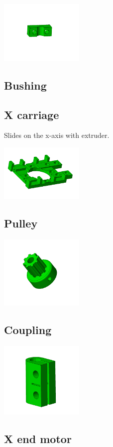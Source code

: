 \documentclass[11pt]{article}
\begin{document}
\includegraphics[width=4cm]{images/rod-clamp.jpg}
\subsection{Bushing}


\subsection{X carriage}
Slides on the x-axis with extruder.

\includegraphics[width=4cm]{images/x-carriage.jpg}
\subsection{Pulley}


\includegraphics[width=4cm]{images/pulley.jpg}
\subsection{Coupling}


\includegraphics[width=4cm]{images/coupling.jpg}
\subsection{X end motor}
\end{document}
